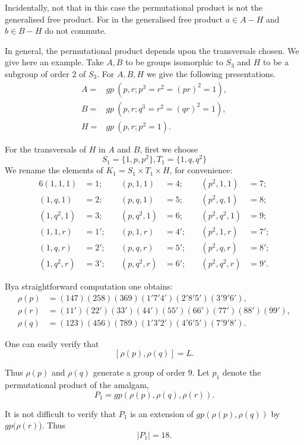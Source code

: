 Incidentally, not that in this case the permutational product is not
the generalised free product. For in the generalised free product $a
\in  A - H$ and $b \in  B-H$ do not commute. 
 
In general, the permutational product depends upon the transversals
chosen. We give here an example. Take $A,B$ to be groups isomorphic to
$S_3$ and $H$ to be a subgroup of order $2$ of $S_3$. For $A, B, H$ we
give the following presentations. 
\begin{align*}
  A =& gp~(p,r; p^3 = r^2 = (p r)^2 = 1), \\
  B =& gp~(p,r; q^3 = r^2 = (q r)^2 = 1), \\
  H =& gp~(p,r; p^2 = 1).
\end{align*}
 
For the transversals of $H$ in $A$ and $B$, first we choose
$$
S_1 =\bigg \{1,  p, p^2 \bigg\}, T_1 =\bigg \{1, q, q ^2\bigg\}
$$
We rename the elements of $K_1 = S_1 \times T_1 \times H$, for
convenience: 
\begin{alignat*}{6}
  (1, 1, 1) & = 1; &(p, 1,1) &= 4; \quad &(p^2,  1, 1) & = 7; \\
  (1, q, 1) & = 2; &(p, q,1) &= 5; &(p^2,  q, 1) &= 8; \\
  (1, q^2, 1) & = 3; &(p, q^2,1) &= 6; &(p^2,  q^2, 1) &= 9; \\
  (1, 1, r) & = 1'; &(p, 1,r) &= 4'; &(p^2,  1, r) &= 7'; \\
  (1, q, r) & = 2'; \quad &(p, q, r) &= 5';\quad  &(p^2,  q, r) &= 8'; \\
  (1, q^2, r) & = 3'; &(p, q^2, r) &= 6'; &(p^2,  q^2, r) &= 9'.
\end{alignat*}
 
By\pageoriginale a straightforward  computation one obtains:
\begin{align*}
  \rho(p) & = (147) (258)(369) (1' 7' 4') (2' 8' 5') (3' 9' 6'),\\
  \rho(r) & = (11') (22') (33') (44') (55') (66') (77') (88')(99'), \\
  \rho(q) & = (123) (456) (789) (1' 3' 2') (4' 6' 5') (7' 9' 8').
\end{align*}
 
One can easily verify that 
$$
[\rho (p), \rho(q)] = L.
$$ 	

Thus $\rho(p)$ and $\rho(q)$ generate a group of order $9$. Let $p_1$
denote the permutational product of the amalgam, 
$$
P_1 = gp (\rho(p), \rho(q), \rho(r)).
$$

It is not difficult to verify that $P_1$ is an extension of $gp
(\rho(p), \rho(q))$ by $gp(\rho(r)$). Thus\pageoriginale  
$$
|P_1| = 18.
$$

